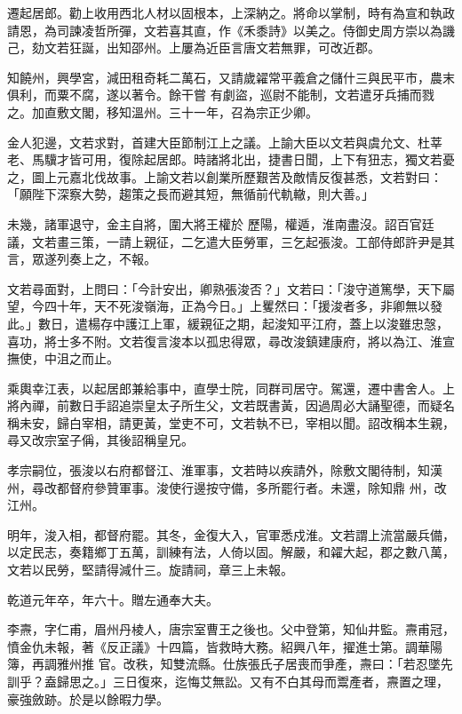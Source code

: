 \begin{pinyinscope}
 遷起居郎。勸上收用西北人材以固根本，上深納之。將命以掌制，時有為宣和執政請恩，為司諫凌哲所彈，文若喜其直，作《禾黍詩》以美之。侍御史周方崇以為譏己，劾文若狂誕，出知邵州。上屢為近臣言唐文若無罪，可改近郡。



 知饒州，興學宮，減田租奇耗二萬石，又請歲糴常平義倉之儲什三與民平市，農末俱利，而粟不腐，遂以著令。餘干嘗
 有劇盜，巡尉不能制，文若遣牙兵捕而戮之。加直敷文閣，移知溫州。三十一年，召為宗正少卿。



 金人犯邊，文若求對，首建大臣節制江上之議。上諭大臣以文若與虞允文、杜莘老、馬驥才皆可用，復除起居郎。時諸將北出，捷書日聞，上下有狃志，獨文若憂之，圖上元嘉北伐故事。上諭文若以創業所歷艱苦及敵情反復甚悉，文若對曰：「願陛下深察大勢，趨策之長而避其短，無循前代軌轍，則大善。」



 未幾，諸軍退守，金主自將，圍大將王權於
 歷陽，權遁，淮南盡沒。詔百官廷議，文若畫三策，一請上親征，二乞遣大臣勞軍，三乞起張浚。工部侍郎許尹是其言，眾遂列奏上之，不報。



 文若尋面對，上問曰：「今計安出，卿熟張浚否？」文若曰：「浚守道篤學，天下屬望，今四十年，天不死浚嶺海，正為今日。」上矍然曰：「援浚者多，非卿無以發此。」數日，遣楊存中護江上軍，緩親征之期，起浚知平江府，蓋上以浚雖忠愨，喜功，將士多不附。文若復言浚本以孤忠得眾，尋改浚鎮建康府，將以為江、淮宣
 撫使，中沮之而止。



 乘輿幸江表，以起居郎兼給事中，直學士院，同群司居守。駕還，遷中書舍人。上將內禪，前數日手詔追崇皇太子所生父，文若既書黃，因過周必大誦聖德，而疑名稱未安，歸白宰相，請更黃，堂吏不可，文若執不已，宰相以聞。詔改稱本生親，尋又改宗室子偁，其後詔稱皇兄。



 孝宗嗣位，張浚以右府都督江、淮軍事，文若時以疾請外，除敷文閣待制，知漢州，尋改都督府參贊軍事。浚使行邊按守備，多所罷行者。未還，除知鼎
 州，改江州。



 明年，浚入相，都督府罷。其冬，金復大入，官軍悉戍淮。文若謂上流當嚴兵備，以定民志，奏籍鄉丁五萬，訓練有法，人倚以固。解嚴，和糴大起，郡之數八萬，文若以民勞，堅請得減什三。旋請祠，章三上未報。



 乾道元年卒，年六十。贈左通奉大夫。



 李燾，字仁甫，眉州丹棱人，唐宗室曹王之後也。父中登第，知仙井監。燾甫冠，憤金仇未報，著《反正議》十四篇，皆救時大務。紹興八年，擢進士第。調華陽簿，再調雅州推
 官。改秩，知雙流縣。仕族張氏子居喪而爭產，燾曰：「若忍墜先訓乎？盍歸思之。」三日復來，迄悔艾無訟。又有不白其母而鬻產者，燾置之理，豪強斂跡。於是以餘暇力學。




\end{pinyinscope}
